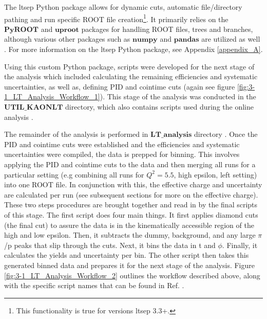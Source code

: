 \documentclass[
]{report}
\begin{document}
The ltsep Python package allows for dynamic cuts, automatic
file/directory pathing and run specific ROOT file
creation\footnote{This functionality is true for versions ltsep 3.3+.}.
It primarily relies on the \(\textbf{PyROOT}\) and \(\textbf{uproot}\)
packages for handling ROOT files, trees and branches, although various
other packages such as \(\textbf{numpy}\) and \(\textbf{pandas}\) are
utilized as well \cite{pivarski_Python_2021} \cite{root_team_how_2023}
\cite{numpy_developers_numpy_2023} \cite{numfocus_inc_pandas_2023}. For
more information on the ltsep Python package, see Appendix
\ref{appendix_A}.

Using this custom Python package, scripts were developed for the next
stage of the analysis which included calculating the remaining
efficiencies and systematic uncertainties, as well as, defining PID and
cointime cuts (again see figure \ref{fig:3-1_LT_Analysis_Workflow_1}).
This stage of the analysis was conducted in the
\(\textbf{UTIL\_KAONLT}\) directory, which also contains scripts used
during the online analysis \cite{kay_github_2018}.



The remainder of the analysis is performed in \(\textbf{LT\_analysis}\)
directory \cite{trotta_github_2022}. Once the PID and cointime cuts were
established and the efficiencies and systematic uncertainties were
compiled, the data is prepped for binning. This involves applying the
PID and cointime cuts to the data and then merging all runs for a
particular setting (e.g combining all runs for \(Q^2=5.5\), high
epsilon, left setting) into one ROOT file. In conjunction with this, the
effective charge and uncertainty are calculated per run (see subsequent
sections for more on the effective charge). These two steps procedures
are brought together and read in by the final scripts of this stage. The
first script does four main things. It first applies diamond cuts (the
final cut) to assure the data is in the kinematically accessible region
of the high and low epsilon. Then, it subtracts the dummy, background,
and any large \(\pi\)/p peaks that slip through the cuts. Next, it bins
the data in t and \(\phi\). Finally, it calculates the yields and
uncertainty per bin. The other script then takes this generated binned
data and prepares it for the next stage of the analysis. Figure
\ref{fig:3-1_LT_Analysis_Workflow_2} outlines the workflow described
above, along with the specific script names that can be found in Ref.
\cite{trotta_github_2022}.
\end{document}
